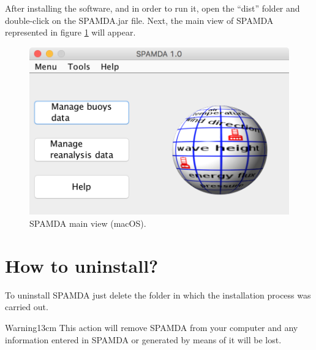 \begin{onehalfspace}
				After installing the software, and in order to run it, open the ``dist'' folder and double-click on the SPAMDA.jar file. Next, the main view of SPAMDA represented in figure \ref{fig:SPAMDAmainViewonMacOS} will appear.
				
				\begin{figure}[ht!]
					\centering
					\includegraphics[scale=0.50]{figures/mainViewonMacOS.png}
					\caption{SPAMDA main view (macOS).}
					\label{fig:SPAMDAmainViewonMacOS}
				\end{figure}

			
		\section{How to uninstall?}
		
			To uninstall SPAMDA just delete the folder in which the installation process was carried out. 
			
			\begin{center}
				\begin{warningbox}{Warning}{13cm}
					This action will remove SPAMDA from your computer and any information entered in SPAMDA or generated by means of it will be lost.
				\end{warningbox}
			\end{center}

	\end{onehalfspace}
